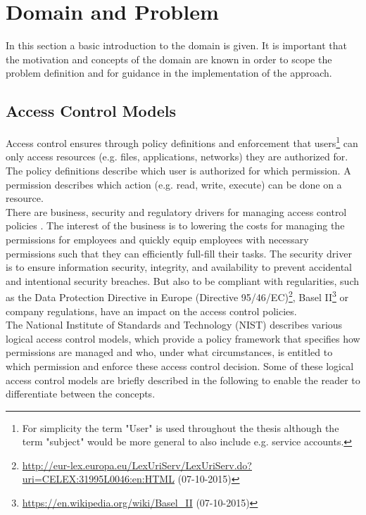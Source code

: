 \newpage
\section{Domain and Problem}
In this section a basic introduction to the domain is given. It is important that the motivation and concepts of the domain are known in order to scope the problem definition and for guidance in the implementation of the approach.

    \subsection{Access Control Models}
    Access control ensures through policy definitions and enforcement that users\footnote{For simplicity the term "User" is used throughout the thesis although the term "subject" would be more general to also include e.g. service accounts.} can only access resources (e.g. files, applications, networks) they are authorized for. The policy definitions describe which user is authorized for which permission. A permission describes which action (e.g. read, write, execute) can be done on a resource.\\
    There are business, security and regulatory drivers for managing access control policies \cite{o20102010}. The interest of the business is to lowering the costs for managing the permissions for employees and quickly equip employees with necessary permissions such that they can efficiently full-fill their tasks. The security driver is to ensure information security, integrity, and availability to prevent accidental and intentional security breaches. But also to be compliant with regularities, such as the Data Protection Directive in Europe (Directive 95/46/EC)\footnote{\url{http://eur-lex.europa.eu/LexUriServ/LexUriServ.do?uri=CELEX:31995L0046:en:HTML} (07-10-2015)}, Basel II\footnote{\url{https://en.wikipedia.org/wiki/Basel_II} (07-10-2015)} or company regulations, have an impact on the access control policies.\\
    The National Institute of Standards and Technology (NIST) \cite{Hu13guideto} describes various logical access control models, which provide a policy framework that specifies how permissions are managed and who, under what circumstances, is entitled to which permission and enforce these access control decision. Some of these logical access control models are briefly described in the following to enable the reader to differentiate between the concepts.
    \iffalse There is no consensus on the terms access control models, mechanisms and techniques. In this thesis an access control policy model describes a policy framework that specifies how permissions are managed and who, under what circumstances, is entitled to which permission on a high-level. There are different Access Control Policy Models which come with different advantages and disadvantages. Some of these models are briefly described in the following to enable the reader to differentiate between the concepts. \fi

